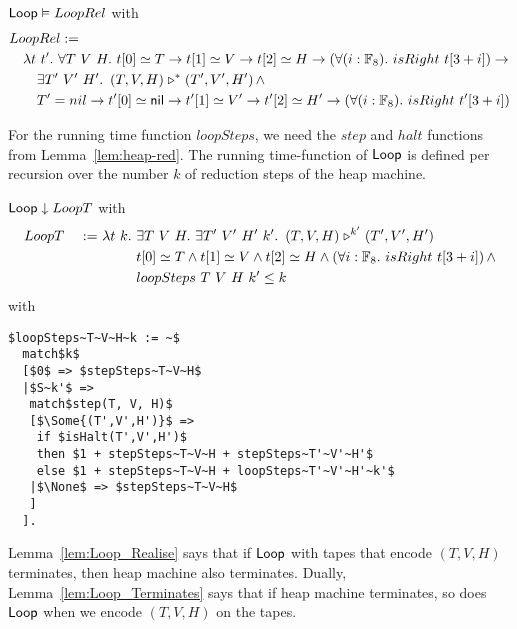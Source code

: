 \begin{lemma}
  \label{lem:Loop_Realise}
  $\mathsf{Loop} \mathrel{\vDash} LoopRel$ with
  \begin{alignat*}{1}
    & LoopRel := \\
    &\quad \lambda t~t'.~\forall T~V~H.~ t[0] \simeq T \rightarrow t[1] \simeq V \rightarrow t[2] \simeq H \rightarrow \left(\forall (i:\mathbb{F}_8).~isRight~t[3+i]\right) \rightarrow \\
    &\qquad \exists T'~V'~H'.~ \left(T,V,H\right) \mathrel{\triangleright}^* \left(T',V',H'\right) \land \\ 
    &\qquad T' = nil \rightarrow t'[0] \simeq \mathsf{nil} \rightarrow t'[1] \simeq V' \rightarrow t'[2] \simeq H' \rightarrow \left(\forall (i:\mathbb{F}_8).~isRight~t'[3+i]\right)
  \end{alignat*}
\end{lemma}

For the running time function $loopSteps$, we need the $step$ and $halt$ functions from Lemma~\ref{lem:heap-red}.  The running time-function of $\mathsf{Loop}$ is
defined per recursion over the number $k$ of reduction steps of the heap machine.
\begin{lemma}
  \label{lem:Loop_Terminates}
  $\mathsf{Loop} \mathrel{\downarrow} LoopT$ with
  \begin{alignat*}{2}
    &LoopT &~:=~& \lambda t~k.~\exists T~V~H.~\exists T'~V'~H'~k'.~ \left(T,V,H\right) \mathrel{\triangleright}^{k'} \left(T',V',H'\right) \\
    &      &    & \phantom{\lambda t~k.}~t[0] \simeq T \land t[1] \simeq V \land t[2] \simeq H \land \left(\forall i:\mathbb{F}_8.~isRight~t[3+i]\right) \land \\
    &      &    & \phantom{\lambda t~k.}~loopSteps~T~V~H~k' \leq k
  \end{alignat*}
  with
  \small
\begin{lstlisting}[style=semicoqstyle]
$loopSteps~T~V~H~k := ~$
  match$k$
  [$0$ => $stepSteps~T~V~H$
  |$S~k'$ =>
   match$step(T, V, H)$
   [$\Some{(T',V',H')}$ =>
    if $isHalt(T',V',H')$
    then $1 + stepSteps~T~V~H + stepSteps~T'~V'~H'$
    else $1 + stepSteps~T~V~H + loopSteps~T'~V'~H'~k'$
   |$\None$ => $stepSteps~T~V~H$
   ]
  ].
\end{lstlisting}
\end{lemma}

Lemma~\ref{lem:Loop_Realise} says that if $\mathsf{Loop}$ with tapes that encode $(T,V,H)$ terminates, then heap machine also terminates.  Dually,
Lemma~\ref{lem:Loop_Terminates} says that if heap machine terminates, so does $\mathsf{Loop}$ when we encode $(T,V,H)$ on the tapes.

